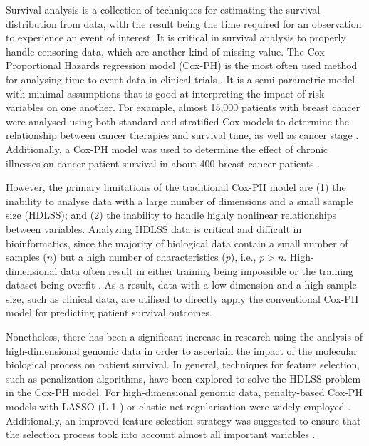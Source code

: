 \documentclass[10pt,twocolumn,twoside,lineno]{gsajnl}
\begin{document}
Survival analysis is a collection of techniques for estimating the survival distribution from data, with the result being the time required for an observation to experience an event of interest. It is critical in survival analysis to properly handle censoring data, which are another kind of missing value. The Cox Proportional Hazards regression model (Cox-PH) is the most often used method for analysing time-to-event data in clinical trials \citep{Ahmed2007, Chen2012}. It is a semi-parametric model with minimal assumptions that is good at interpreting the impact of risk variables on one another. For example, almost 15,000 patients with breast cancer were analysed using both standard and stratified Cox models to determine the relationship between cancer therapies and survival time, as well as cancer stage \citep{Abadi2014}. Additionally, a Cox-PH model was used to determine the effect of chronic illnesses on cancer patient survival in about 400 breast cancer patients \citep{Atashgar}.



However, the primary limitations of the traditional Cox-PH model are (1) the inability to analyse data with a large number of dimensions and a small sample size (HDLSS); and (2) the inability to handle highly nonlinear relationships between variables. Analyzing HDLSS data is critical and difficult in bioinformatics, since the majority of biological data contain a small number of samples ($n$) but a high number of characteristics ($p$), i.e., $p > n$. High-dimensional data often result in either training being impossible or the training dataset being overfit \citep{Witten2009}. As a result, data with a low dimension and a high sample size, such as clinical data, are utilised to directly apply the conventional Cox-PH model for predicting patient survival outcomes.

Nonetheless, there has been a significant increase in research using the analysis of high-dimensional genomic data in order to ascertain the impact of the molecular biological process on patient survival.
In general, techniques for feature selection, such as penalization algorithms, have been explored to solve the HDLSS problem in the Cox-PH model.
For high-dimensional genomic data, penalty-based Cox-PH models with LASSO (L 1 ) or elastic-net regularisation were widely employed \citep{10.1093/biomet/asm037, Tibshirani+2009, JSSv039i05, Xu2012}.
Additionally, an improved feature selection strategy was suggested to ensure that the selection process took into account almost all important variables \citep{Fan2010}.
\end{document}
